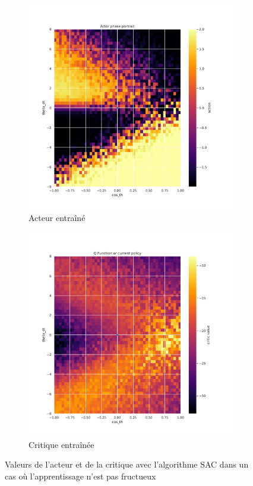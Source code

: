 \begin{figure}[H]
    \centering
    \begin{subfigure}{0.45\textwidth}
        \includegraphics[width=\textwidth]{figures/sac_itr2/8_actor_SAC__post_Pendulum-v0.pdf}
        \caption{Acteur entraîné}
    \end{subfigure}
    \begin{subfigure}{0.45\textwidth}
        \includegraphics[width=\textwidth]{figures/sac_itr2/8_critic_SAC_q1_post_Pendulum-v0.pdf}
        \caption{Critique entraînée}
    \end{subfigure}
    \caption{Valeurs de l'acteur et de la critique avec l'algorithme SAC dans un cas où l'apprentissage n'est pas fructueux}
    \label{fig:sac:itr2}
\end{figure}

